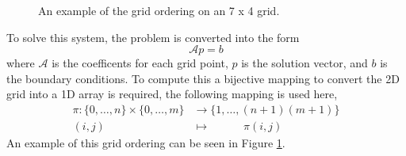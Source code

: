 \begin{figure}[htb]
\begin{center}
    \caption{An example of the grid ordering on an 7 x 4 grid.}
    \label{graph:gridordering}
  \end{center}
\end{figure}


To solve this system, the problem is converted into the form
\begin{equation}
  \mathcal{A} p = b
\end{equation}
where $\mathcal{A}$ is the coefficents for each grid point, $p$ is the solution vector, and $b$ is the boundary conditions. To compute this a bijective mapping to convert the 2D grid into a 1D array is required, the following mapping is used here,
\begin{equation}
  \begin{aligned}
    \pi : \{0,\ldots, n\} \times \{0, \ldots, m \} &\to \{ 1, \ldots, (n+1)(m+1) \} \\
          (i,j) \qquad \qquad &\mapsto  \quad \qquad \pi(i,j)
  \end{aligned}
\end{equation}
An example of this grid ordering can be seen in Figure \ref{graph:gridordering}.

